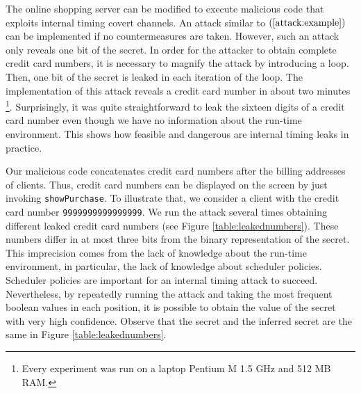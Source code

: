 \documentclass[times, 10pt,twocolumn]{article}
\begin{document}
{%

The online shopping server can be modified to 
execute malicious code that exploits internal timing covert
channels. An attack similar to $(\ref{attack:example})$
can be implemented if no countermeasures are taken. 
However, such an attack only reveals one bit of the secret. 
In order for the attacker to obtain complete  
credit card numbers, it is necessary to magnify the attack by introducing a
loop. Then, one bit of the secret is leaked in each iteration of the loop.
The implementation of this attack reveals a credit 
card number in about two minutes 
\footnote{Every experiment was run on a laptop Pentium M 1.5 GHz and 512 MB
  RAM.}. 
Surprisingly, it was quite straightforward to 
leak the sixteen digits of a credit card number even though 
we have no information about the run-time environment.
This shows how feasible   
and dangerous are internal timing leaks in practice.

Our malicious code concatenates credit card 
numbers after the billing addresses of clients. 
Thus, credit card numbers can be displayed on the screen by just
invoking \texttt{showPurchase}. To illustrate that, we consider
a client with the credit card number \texttt{9999999999999999}.
We run the  
attack several times obtaining different leaked credit card numbers
(see Figure \ref{table:leakednumbers}). These numbers 
differ in at most three bits from the binary representation of
the secret. This imprecision  comes from the lack of 
knowledge about the run-time environment, in particular, the lack of
knowledge about scheduler policies. Scheduler policies 
are important for an internal timing attack to succeed. 
Nevertheless, by repeatedly running the
attack and taking the most frequent boolean values in each
position, it is possible to obtain the value of the secret with very
high confidence. Observe that the secret and the inferred secret are the same 
in Figure \ref{table:leakednumbers}.


}
\end{document}
